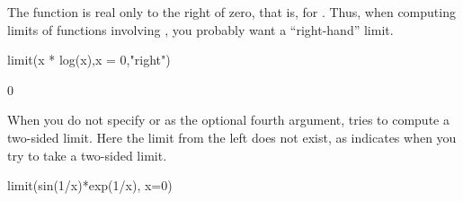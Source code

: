{{{{{{{{{{{{\begin{xtc}
\begin{xtccomment}
The function  is real only to the right of zero,
that is, for .
Thus, when computing limits of functions involving ,
you probably want a ``right-hand'' limit.
\end{xtccomment}
\begin{spadsrc}
limit(x * log(x),x = 0,"right")
\end{spadsrc}
\begin{TeXOutput}
\begin{fricasmath}{2}
0%
\end{fricasmath}
\end{TeXOutput}
\end{xtc}
\begin{xtc}
\begin{xtccomment}
When you do not specify  or  as the
optional fourth argument,  tries to compute a
two-sided limit.
Here the limit from the left does not exist, as \Language{}
indicates when you try to take a two-sided limit.
\end{xtccomment}
\begin{spadsrc}
limit(sin(1/x)*exp(1/x), x=0)
\end{spadsrc}
\begin{TeXOutput}
\begin{fricasmath}{3}
%
\end{fricasmath}
\end{TeXOutput}
\end{xtc}

}}}}}}}}}}}}
